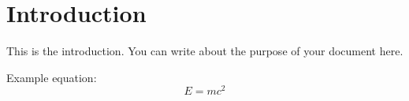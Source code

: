 \section{Introduction}
This is the introduction. You can write about the purpose of your document here.

Example equation:
\begin{equation}
    E = mc^2
\end{equation}
